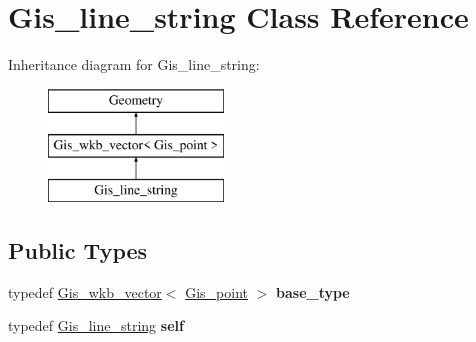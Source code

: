 \hypertarget{classGis__line__string}{}\section{Gis\+\_\+line\+\_\+string Class Reference}
\label{classGis__line__string}
Inheritance diagram for Gis\+\_\+line\+\_\+string\+:\begin{figure}[H]
\begin{center}
\leavevmode
\includegraphics[height=3.000000cm]{classGis__line__string}
\end{center}
\end{figure}
\subsection*{Public Types}
\begin{DoxyCompactItemize}
\item 
\mbox{\label{classGis__line__string_a20273dfad53555e74a92cc438e4d358e}} 
typedef \mbox{\hyperlink{classGis__wkb__vector}{Gis\+\_\+wkb\+\_\+vector}}$<$ \mbox{\hyperlink{classGis__point}{Gis\+\_\+point}} $>$ {\bfseries base\+\_\+type}
\item 
\mbox{\label{classGis__line__string_afd806f6a0da3874ee10377eac403fa9b}} 
typedef \mbox{\hyperlink{classGis__line__string}{Gis\+\_\+line\+\_\+string}} {\bfseries self}
\end{DoxyCompactItemize}
